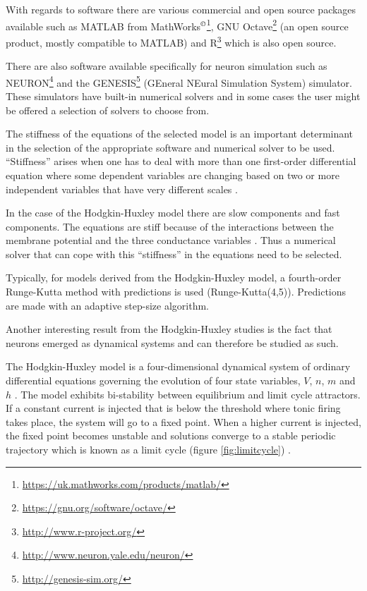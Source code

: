 With regards to software there are various commercial and open source packages available such as MATLAB from MathWorks$^{\copyright}$\footnote{\url{https://uk.mathworks.com/products/matlab/}}, GNU Octave\footnote{\url{https://gnu.org/software/octave/}} (an open source product, mostly compatible to MATLAB) and R\footnote{\url{http://www.r-project.org/}} which is also open source. 

There are also software available specifically for neuron simulation such as NEURON\footnote{\url{http://www.neuron.yale.edu/neuron/}} and the GENESIS\footnote{\url{http://genesis-sim.org/}} (GEneral NEural Simulation System) simulator. These simulators have built-in numerical solvers and in some cases the user might be offered a selection of solvers to choose from.

The stiffness of the equations of the selected model is an important determinant in the selection of the appropriate software and numerical solver to be used. ``Stiffness'' arises when one has to deal with more than one first-order differential equation where some dependent variables are changing based on two or more independent variables that have very different scales \cite{Press1992}.


In the case of the Hodgkin-Huxley model there are slow components and fast components. The equations are stiff because of the interactions between the membrane potential and the three conductance variables \cite{Chance1981}. Thus a numerical solver that can cope with this ``stiffness'' in the equations need to be selected.

Typically, for models derived from the Hodgkin-Huxley model, a fourth-order Runge-Kutta method with predictions is used (Runge-Kutta(4,5)). Predictions are made with an adaptive step-size algorithm.

Another interesting result from the Hodgkin-Huxley studies is the fact that neurons emerged as dynamical systems and can therefore be studied as such. 

The Hodgkin-Huxley model is a four-dimensional dynamical system of ordinary differential equations governing the evolution of four state variables, $V$, $n$, $m$ and $h$ \cite{Izhikevich2007}. The model exhibits bi-stability between equilibrium and limit cycle attractors. If a constant current is injected that is below the threshold where tonic firing takes place, the system will go to a fixed point. When a higher current is injected, the fixed point becomes unstable and solutions converge to a stable periodic trajectory which is known as a limit cycle (figure \ref{fig:limitcycle}) \cite{Fitzhugh1960, Meunier2001}.


